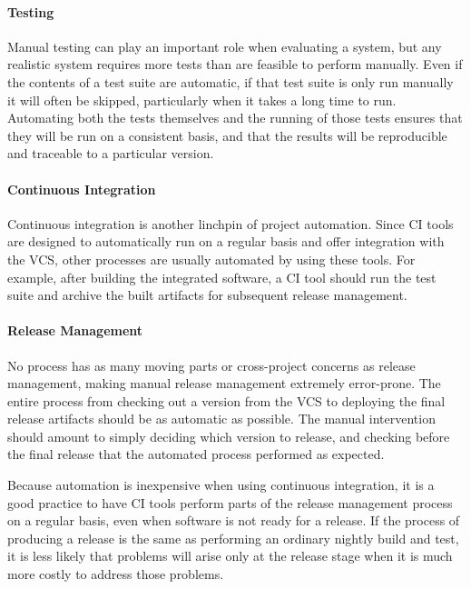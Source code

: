 \paragraph{Testing}

Manual testing can play an important role when evaluating a system,
but any realistic system requires more tests than are feasible to
perform manually. Even if the contents of a test suite are automatic,
if that test suite is only run manually it will often be skipped,
particularly when it takes a long time to run. Automating both the
tests themselves and the running of those tests ensures that they will
be run on a consistent basis, and that the results will be
reproducible and traceable to a particular version.

\paragraph{Continuous Integration}

Continuous integration is another linchpin of project
automation. Since CI tools are designed to automatically run on a
regular basis and offer integration with the VCS, other processes are
usually automated by using these tools. For example, after building
the integrated software, a CI tool should run the test suite and
archive the built artifacts for subsequent release management.

\paragraph{Release Management}

No process has as many moving parts or cross-project concerns as
release management, making manual release management extremely
error-prone. The entire process from checking out a version from the
VCS to deploying the final release artifacts should be as automatic as
possible. The manual intervention should amount to simply deciding
which version to release, and checking before the final release that
the automated process performed as expected.

Because automation is inexpensive when using continuous integration,
it is a good practice to have CI tools perform parts of the release
management process on a regular basis, even when software is not ready
for a release. If the process of producing a release is the same as
performing an ordinary nightly build and test, it is less likely that
problems will arise only at the release stage when it is much more
costly to address those problems.

